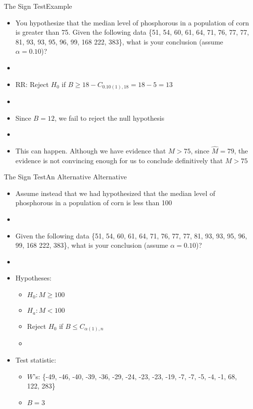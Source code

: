 \documentclass[xcolor=dvipsnames]{beamer}
\begin{document}
\begin{frame}{The Sign Test}{Example}
\begin{itemize}
	\item You hypothesize that the median level of phosphorous in a population of corn is greater than 75. Given the following data \{51, 54, 60, 61, 64, 71, 76, 77, 77, 81, 93, 93, 95, 96, 99, 168 222, 383\}, what is your conclusion (assume $\alpha = 0.10$)?
	\item[]
	\item RR: Reject $H_0$ if $B \geq 18 - C_{0.10(1), 18} = 18 - 5 = 13$ \pause
	\item[]
	\item Since $B = 12$, we fail to reject the null hypothesis \pause
	\item[]
	\item This can happen. Although we have evidence that $M > 75$, since $\hat{M} = 79$, the evidence is not convincing enough for us to conclude definitively that $M > 75$
\end{itemize}
\end{frame}

\begin{frame}{The Sign Test}{An Alternative Alternative}
	\begin{itemize}
		\item Assume instead that we had hypothesized that the median level of phosphorous in a population of corn is less than 100 \pause
		\item[]
		\item Given the following data \{51, 54, 60, 61, 64, 71, 76, 77, 77, 81, 93, 93, 95, 96, 99, 168 222, 383\}, what is your conclusion (assume $\alpha = 0.10$)? \pause
		\item[]
		\item Hypotheses: \pause
		\begin{itemize}
			\item $H_0: M \geq 100$ \pause
			\item $H_a: M < 100$ \pause
			\item Reject $H_0$ if $B \leq C_{\alpha(1), n}$ \pause
			\item[]
		\end{itemize}
	\item Test statistic: \pause
	\begin{itemize}
		\item $W$'s: \{-49, -46, -40, -39, -36, -29, -24, -23, -23, -19, -7, -7, -5, -4, -1, 68, 122, 283\} \pause
		\item $B = 3$
	\end{itemize}
	\end{itemize}
\end{frame}
\end{document}
